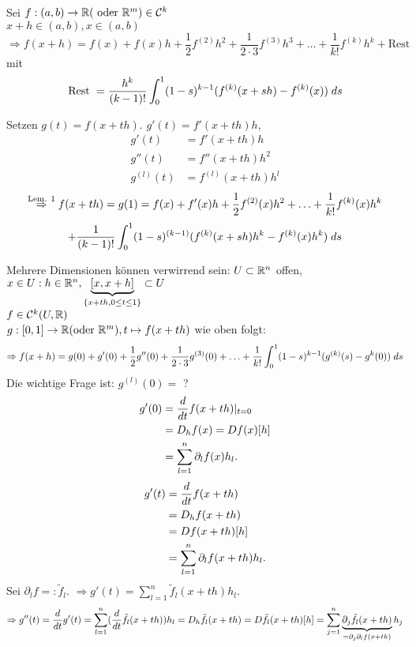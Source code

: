 \documentclass[../ana2.tex]{subfiles}
\begin{document}
\begin{kor}
    Sei \(\abb{f}{(a,b)}{\R} (\text{ oder } \R^m) \in \mathcal{C}^k \)\\
    \( x+h \in (a,b), x \in (a,b) \)
    \[ \Rightarrow f(x+h) = f(x) + f(x)h + \frac{1}{2}f^{(2)}h^2
    + \frac{1}{2 \cdot 3}f^{(3)}h^3 + \ldots + \frac{1}{k!}f^{(k)}h^k + \text{Rest} \]
    mit 
    \[ \text{Rest } = \frac{h^k}{(k-1)!} 
    \integralx{(1-s)^{k-1}(f^{(k)}(x + sh) - f^{(k)}(x))}{0}{1}{s} \]
\end{kor}
\begin{bew}
    Setzen \( g(t) = f(x + th) \). \( g'(t) = f'(x + th) h \), 
    \begin{align*}
        g'(t) &= f'(x+th)h \\
        g''(t) &= f''(x + th)h^2 \\
        g^{(l)}(t) &= f^{(l)}(x + th)h^l
    \end{align*}
    \[ \oversett{Lem. 1}{\Rightarrow} f(x+th) = g(1) = f(x) + f'(x)h
    + \frac{1}{2}f^{(2)}(x)h^2 + \ldots + \frac{1}{k!}f^{(k)}(x)h^k\]
    \[ + \frac{1}{(k-1)!} \integralx{(1-s)^{(k-1)} 
    (f^{(k)}(x+sh)h^k - f^{(k)}(x)h^k)}{0}{1}{s} \]
\end{bew}
Mehrere Dimensionen können verwirrend sein:
\( U \subset \R^n \) offen, \(x \in U: h \in \R^n, 
\underbrace{[x,x+h]}_{\set{x+th, 0 \leq t \leq 1}} \subset U\)\\
\(f \in \mathcal{C}^k(U, \R)\)\\
\( \abb{g}{[0,1]}{\R} (\text{oder } \R^m), t \mapsto f(x+th) \)
wie oben folgt:
\[ \Rightarrow f(x+h) = g(0) + g'(0) + \frac{1}{2}g''(0) + \frac{1}{2 \cdot 3}g^{(3)}(0)
+ \ldots + \frac{1}{k!} \integralx{(1-s)^{k-1} (g^{(k)}(s)-g^{k}(0))}{0}{1}{s} \]
Die wichtige Frage ist: \( g^{(l)}(0) =  \) ?
\begin{align*}
    g'(0) &= \ddx{t} f(x + th) \vert_{t=0} \\
    &= D_h f(x) = Df(x)[h] \\
    &= \sum_{l=1}^n \partial_l f(x) h_l.
\end{align*}
\begin{align*}
    g'(t) &= \ddx{t} f(x + th) \\
    &= D_h f(x + th) \\
    &= Df(x + th)[h] \\
    &= \sum_{l=1}^n \partial_l f(x + th) h_l.
\end{align*}
Sei \( \partial_l f =: \tilde{f}_l \).
\( \Rightarrow g'(t) = \sum_{l=1}^n \tilde{f}_l (x + th) h_l \).
\[ \Rightarrow g''(t) = \ddx{t} g'(t) 
= \sum_{l=1}^n(\ddx{t} \tilde{f}_l(x+th))h_l
= D_h\tilde{f}_l(x+th) = D\tilde{f}_l(x+th)[h]
= \sum_{j=1}^n \underbrace{\partial_j \tilde{f}_l(x+th)}
_{= \partial_j\partial_lf(x+th)} h_j \]
\end{document}

